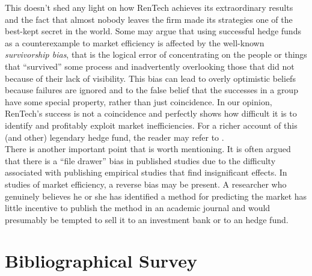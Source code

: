 This doesn't shed any light on how RenTech achieves its extraordinary results and the fact that almost nobody leaves the firm made its strategies one of the best-kept secret in the world. Some may argue that using successful hedge funds as a counterexample to market efficiency is affected by the well-known \emph{survivorship bias}, that is the logical error of concentrating on the people or things that ``survived'' some process and inadvertently overlooking those that did not because of their lack of visibility. This bias can lead to overly optimistic beliefs because failures are ignored and to the false belief that the successes in a group have some special property, rather than just coincidence. In our opinion, RenTech's success is not a coincidence and perfectly shows how difficult it is to identify and profitably exploit market inefficiencies. For a richer account of this (and other) legendary hedge fund, the reader may refer to \cite{mallaby2010more}.\\
There is another important point that is worth mentioning. It is often argued that there is a ``file drawer'' bias in published studies due to the difficulty associated with publishing empirical studies that find insignificant effects. In studies of market efficiency, a reverse bias may be present. A researcher who genuinely believes he or she has identified a method for predicting the market has little incentive to publish the method in an academic journal and would presumably be tempted to sell it to an investment bank or to an hedge fund.\\

\section{Bibliographical Survey}
\label{sec:bibliographical_survey}

